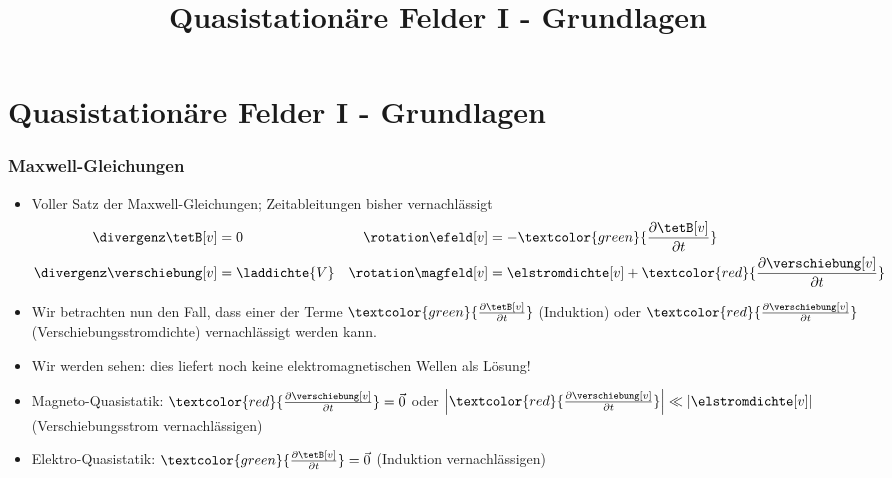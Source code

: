 

\title[TET: Quasistationäre Felder I - Grundlagen]{Quasistationäre Felder I - Grundlagen}


% 
% 

\maketitle

% 
% 
\section{Quasistationäre Felder I - Grundlagen}

\begin{frame}

  \frametitle{Maxwell-Gleichungen}

  \begin{itemize}[<+->]
  \item Voller Satz der Maxwell-Gleichungen; Zeitableitungen bisher vernachlässigt
\begin{align*}
	\divergenz \tetB[v] &= 0 & \rotation \efeld[v] &= - \textcolor{green}{\dfrac{\partial \tetB[v]}{\partial t}} \\
	\divergenz \verschiebung[v] &= \laddichte{V} & \rotation \magfeld[v] &= \elstromdichte[v] + \textcolor{red}{\dfrac{\partial \verschiebung[v]}{\partial t}}
\end{align*}
\item Wir betrachten nun den Fall, dass \alert{einer} der Terme $\textcolor{green}{\frac{\partial \tetB[v]}{\partial t}}$ (Induktion) oder $\textcolor{red}{\frac{\partial \verschiebung[v]}{\partial t}}$ (Verschiebungsstromdichte) vernachlässigt werden kann.
\item Wir werden sehen: dies liefert noch \alert{keine elektromagnetischen Wellen} als Lösung!
  \item \alert{Magneto-Quasistatik}: $\textcolor{red}{\frac{\partial \verschiebung[v]}{\partial t}} = \vec{0}$ oder $\left|\textcolor{red}{\frac{\partial \verschiebung[v]}{\partial t}}\right|\ll |\elstromdichte[v]|$ (Verschiebungsstrom vernachlässigen)
\item \alert{Elektro-Quasistatik}: $\textcolor{green}{\frac{\partial \tetB[v]}{\partial t}}=\vec{0}$ (Induktion vernachlässigen) 
  \end{itemize}
\end{frame}

